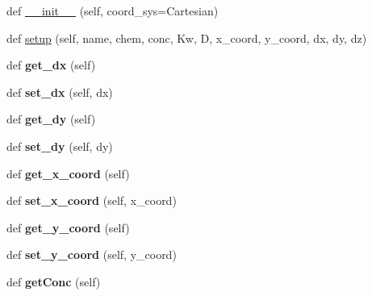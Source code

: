 \begin{DoxyCompactItemize}
\item 
def \hyperlink{classmesh_1_1Mesh_a5037d4b9bd0c7d6c6484a24b7bee710c}{\+\_\+\+\_\+init\+\_\+\+\_\+} (self, coord\+\_\+sys=\textquotesingle{}Cartesian\textquotesingle{})
\item 
def \hyperlink{classmesh_1_1Mesh_a52ee621cf082458a742c8d7e71b802f9}{setup} (self, name, chem, conc, Kw, D, x\+\_\+coord, y\+\_\+coord, dx, dy, dz)
\item 
def {\bfseries get\+\_\+dx} (self)\hypertarget{classmesh_1_1Mesh_aac1703ed48d76086e368185b22379f7c}{}\label{classmesh_1_1Mesh_aac1703ed48d76086e368185b22379f7c}

\item 
def {\bfseries set\+\_\+dx} (self, dx)\hypertarget{classmesh_1_1Mesh_ad40facc36923c9b0fcc0d6363ee6107b}{}\label{classmesh_1_1Mesh_ad40facc36923c9b0fcc0d6363ee6107b}

\item 
def {\bfseries get\+\_\+dy} (self)\hypertarget{classmesh_1_1Mesh_aef4bece754687fe2a3ae90e07829913d}{}\label{classmesh_1_1Mesh_aef4bece754687fe2a3ae90e07829913d}

\item 
def {\bfseries set\+\_\+dy} (self, dy)\hypertarget{classmesh_1_1Mesh_a7f1c6bb5694f587777f426da7c316aa3}{}\label{classmesh_1_1Mesh_a7f1c6bb5694f587777f426da7c316aa3}

\item 
def {\bfseries get\+\_\+x\+\_\+coord} (self)\hypertarget{classmesh_1_1Mesh_af4cefc4542a761b56edd215265b8d367}{}\label{classmesh_1_1Mesh_af4cefc4542a761b56edd215265b8d367}

\item 
def {\bfseries set\+\_\+x\+\_\+coord} (self, x\+\_\+coord)\hypertarget{classmesh_1_1Mesh_ac7be9a536451cb577ebf0ce4debc43c1}{}\label{classmesh_1_1Mesh_ac7be9a536451cb577ebf0ce4debc43c1}

\item 
def {\bfseries get\+\_\+y\+\_\+coord} (self)\hypertarget{classmesh_1_1Mesh_a56c7c5fdde333f511510d3af6cfda02e}{}\label{classmesh_1_1Mesh_a56c7c5fdde333f511510d3af6cfda02e}

\item 
def {\bfseries set\+\_\+y\+\_\+coord} (self, y\+\_\+coord)\hypertarget{classmesh_1_1Mesh_a13639a3444151885aeec0ae65e451752}{}\label{classmesh_1_1Mesh_a13639a3444151885aeec0ae65e451752}

\item 
def {\bfseries get\+Conc} (self)\hypertarget{classmesh_1_1Mesh_a0a358fc09db4af0d46d696bb796bca66}{}\label{classmesh_1_1Mesh_a0a358fc09db4af0d46d696bb796bca66}


\end{DoxyCompactItemize}
